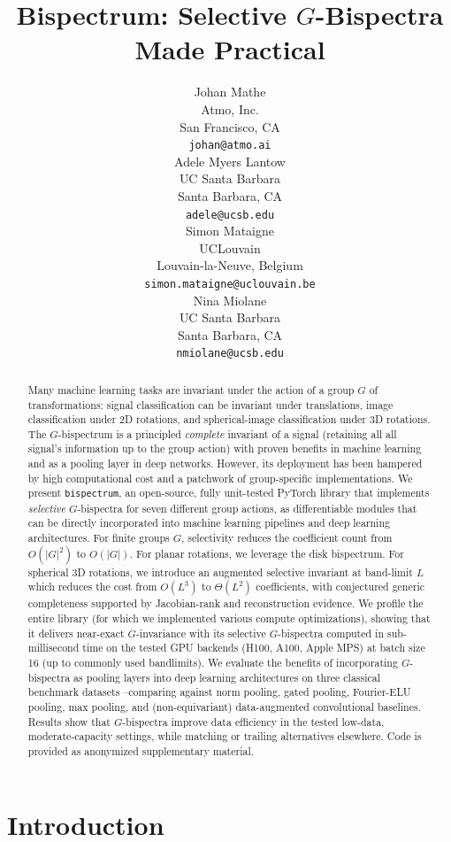 \documentclass{article}
\title{Bispectrum: Selective $G$-Bispectra\texorpdfstring{\\}{ }Made Practical}
\author{Johan Mathe \\
Atmo, Inc.\\
San Francisco, CA \\
\texttt{johan@atmo.ai} \\
\And
Adele Myers Lantow \\
UC Santa Barbara \\
Santa Barbara, CA \\
\texttt{adele@ucsb.edu} \\
\AND
Simon Mataigne \\
UCLouvain \\
Louvain-la-Neuve, Belgium \\
\texttt{simon.mataigne@uclouvain.be} \\
\And
Nina Miolane \\
UC Santa Barbara \\
Santa Barbara, CA \\
\texttt{nmiolane@ucsb.edu}
}
\theoremstyle{definition}
\theoremstyle{remark}
\theoremstyle{definition}
\begin{document}
\maketitle

\begin{abstract}
Many machine learning tasks are invariant under the action of a group $G$ of transformations: signal classification
can be invariant under translations, image
classification under 2D rotations, and spherical-image classification under 3D rotations. The $G$-bispectrum is a principled \emph{complete} invariant of a signal (retaining all all signal's information up to the group action) with proven benefits in machine learning and as a pooling layer in deep networks. However, its
deployment has been hampered by high computational cost and a patchwork of
group-specific implementations.
We present \texttt{bispectrum}, an open-source, fully unit-tested
PyTorch library that implements \emph{selective} $G$-bispectra for seven different group actions, as differentiable modules that can be directly incorporated into machine learning pipelines and deep learning architectures. For finite groups $G$, selectivity
reduces the coefficient count from $O(|G|^2)$ to $O(|G|)$. For planar rotations, we leverage the disk bispectrum. For spherical 3D rotations,
we introduce an augmented selective invariant at band-limit
$L$ which reduces the cost from $O(L^3)$ to $\Theta(L^2)$ coefficients,
with conjectured generic completeness supported by Jacobian-rank and
reconstruction evidence.
We profile the entire library (for which we implemented various compute optimizations), showing that it delivers near-exact $G$-invariance with its selective $G$-bispectra computed in sub-millisecond time on the tested GPU backends (H100, A100, Apple MPS) at batch size 16 (up to commonly used bandlimits). We evaluate the benefits of incorporating $G$-bispectra as pooling layers into deep learning architectures on three classical benchmark datasets --comparing against norm pooling,
gated pooling, Fourier-ELU pooling, max pooling, and (non-equivariant)
data-augmented convolutional baselines. Results show that $G$-bispectra improve data efficiency
in the tested low-data, moderate-capacity settings, while matching or
trailing alternatives elsewhere.
Code is provided as anonymized supplementary material.
\end{abstract}
\section{Introduction}
\label{sec:intro}
\end{document}
